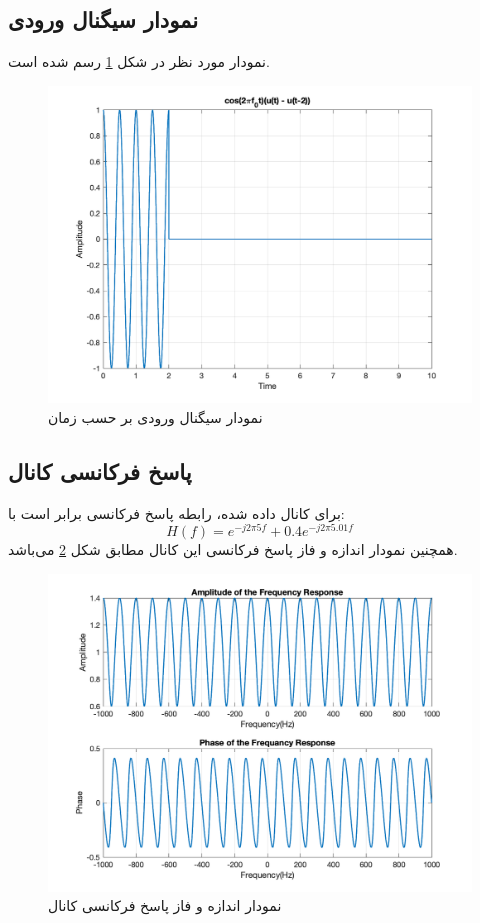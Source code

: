\documentclass[10pt]{article}
\begin{document}
\subsection{نمودار سیگنال ورودی}
نمودار مورد نظر در شکل 
\ref{fig:q2-3}
رسم شده است.
\begin{figure}[h]
	\centering
	\includegraphics[width=1\linewidth]{../pics/q2-3}
	\caption{نمودار سیگنال ورودی بر حسب زمان}
	\label{fig:q2-3}
\end{figure}
\newpage
\subsection{پاسخ فرکانسی کانال}
برای کانال داده شده، رابطه پاسخ فرکانسی برابر است با:
\begin{equation}
	H(f) = e^{-j2\pi 5f} + 0.4e^{-j2\pi 5.01f}
\end{equation}
همچنین نمودار اندازه و فاز پاسخ فرکانسی این کانال مطابق شکل 
\ref{fig:q2-4}
می‌باشد.
\begin{figure}[h!]
	\centering
	\includegraphics[width=0.9\linewidth]{../pics/q2-4}
	\caption{نمودار اندازه و فاز پاسخ فرکانسی کانال}
	\label{fig:q2-4}
\end{figure}
\newpage
\end{document}
